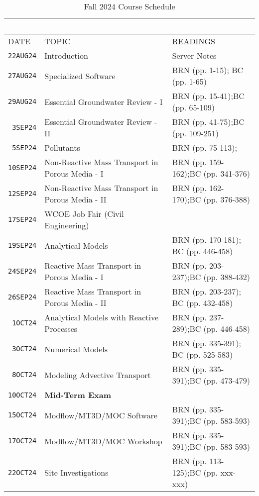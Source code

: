 \documentclass[12pt]{article}
\begin{document}
\begin{table}[ht!]
   \centering
   \caption{Fall 2024 Course Schedule}
   \begin{tabular}{p{0.5in}p{3.0in}p{3.0in}} 
   ~ & ~ & ~  \\
\hline
DATE & TOPIC & READINGS  \\
\hline
\texttt{22AUG24} & Introduction & Server Notes  \\ %
\texttt{27AUG24} & Specialized Software & BRN (pp. 1-15); BC (pp. 1-65) \\ %
\texttt{29AUG24} & Essential Groundwater Review - I  & BRN (pp. 15-41);BC (pp. 65-109) \\ %
\texttt{~3SEP24} & Essential Groundwater Review - II & BRN (pp. 41-75);BC (pp. 109-251)\\ %
\texttt{~5SEP24} & Pollutants &  BRN (pp. 75-113); \\ %
\texttt{10SEP24} & Non-Reactive Mass Transport in Porous Media - I &  BRN (pp. 159-162);BC (pp. 341-376)\\ %
\texttt{12SEP24} & Non-Reactive Mass Transport in Porous Media - II & BRN (pp. 162-170);BC (pp. 376-388)\\ %
\texttt{17SEP24} & WCOE Job Fair (Civil Engineering)   &   \\ %
\texttt{19SEP24} & Analytical Models & BRN (pp. 170-181); BC (pp. 446-458) \\ %
\texttt{24SEP24} & Reactive Mass Transport in Porous Media - I &  BRN (pp. 203-237);BC (pp. 388-432)\\  %
\texttt{26SEP24} & Reactive Mass Transport in Porous Media - II & BRN (pp. 203-237); BC (pp. 432-458) \\ %
\texttt{~1OCT24} & Analytical Models with Reactive Processes & BRN (pp. 237-289);BC (pp. 446-458)\\ %
\texttt{~3OCT24} & Numerical Models & BRN (pp. 335-391); BC (pp. 525-583)  \\  %
\texttt{~8OCT24} & Modeling Advective Transport & BRN (pp. 335-391);BC (pp. 473-479)\\ %
\texttt{10OCT24} & \textbf{Mid-Term Exam} & ~ \\ %
\texttt{15OCT24} & Modflow/MT3D/MOC Software  & BRN (pp. 335-391);BC (pp. 583-593)\\ %
\texttt{17OCT24} & Modflow/MT3D/MOC Workshop & BRN (pp. 335-391);BC (pp. 583-593) \\ %
\texttt{22OCT24} & Site Investigations & BRN (pp. 113-125);BC (pp. xxx-xxx) \\ %

\end{tabular}
\end{table}
\end{document}
